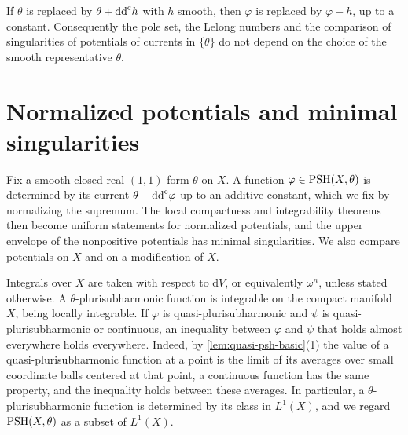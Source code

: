 If $\theta$ is replaced by $\theta+\mathrm{dd}^{\mathrm{c}} h$ with $h$ smooth, then $\varphi$ is replaced by $\varphi-h$, up to a constant. Consequently the pole set, the Lelong numbers and the comparison of singularities of potentials of currents in $\{\theta\}$ do not depend on the choice of the smooth representative $\theta$.

\section{Normalized potentials and minimal singularities}
\label{sec:global-minimal-potentials}
Fix a smooth closed real $(1,1)$-form $\theta$ on $X$. A function $\varphi\in\mathrm{PSH}(X,\theta)$ is determined by its current $\theta+\mathrm{dd}^{\mathrm{c}}\varphi$ up to an additive constant, which we fix by normalizing the supremum. The local compactness and integrability theorems then become uniform statements for normalized potentials, and the upper envelope of the nonpositive potentials has minimal singularities. We also compare potentials on $X$ and on a modification of $X$.

Integrals over $X$ are taken with respect to $\mathrm dV$, or equivalently $\omega^n$, unless stated otherwise. A $\theta$-plurisubharmonic function is integrable on the compact manifold $X$, being locally integrable. If $\varphi$ is quasi-plurisubharmonic and $\psi$ is quasi-plurisubharmonic or continuous, an inequality between $\varphi$ and $\psi$ that holds almost everywhere holds everywhere. Indeed, by \cref{lem:quasi-psh-basic}(1) the value of a quasi-plurisubharmonic function at a point is the limit of its averages over small coordinate balls centered at that point, a continuous function has the same property, and the inequality holds between these averages. In particular, a $\theta$-plurisubharmonic function is determined by its class in $L^1(X)$, and we regard $\mathrm{PSH}(X,\theta)$ as a subset of $L^1(X)$.

